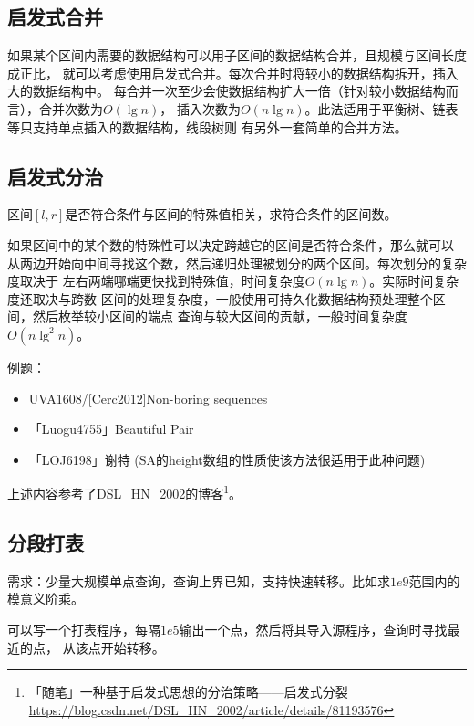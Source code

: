 \subsection{启发式合并}
如果某个区间内需要的数据结构可以用子区间的数据结构合并，且规模与区间长度成正比，
就可以考虑使用启发式合并。每次合并时将较小的数据结构拆开，插入大的数据结构中。
每合并一次至少会使数据结构扩大一倍（针对较小数据结构而言），合并次数为$O(\lg n)$，
插入次数为$O(n\lg n)$。此法适用于平衡树、链表等只支持单点插入的数据结构，线段树则
有另外一套简单的合并方法。
\subsection{启发式分治}
区间$[l,r]$是否符合条件与区间的特殊值相关，求符合条件的区间数。

如果区间中的某个数的特殊性可以决定跨越它的区间是否符合条件，那么就可以
从两边开始向中间寻找这个数，然后递归处理被划分的两个区间。每次划分的复杂度取决于
左右两端哪端更快找到特殊值，时间复杂度$O(n\lg n)$。实际时间复杂度还取决与跨数
区间的处理复杂度，一般使用可持久化数据结构预处理整个区间，然后枚举较小区间的端点
查询与较大区间的贡献，一般时间复杂度$O(n\lg^2 n)$。

例题：
\begin{itemize}
	\item UVA1608/[Cerc2012]Non-boring sequences
	\item 「Luogu4755」Beautiful Pair
	\item 「LOJ6198」谢特 (SA的height数组的性质使该方法很适用于此种问题)
\end{itemize}

上述内容参考了DSL\_HN\_2002的博客\footnote{
	「随笔」一种基于启发式思想的分治策略——启发式分裂
	\url{https://blog.csdn.net/DSL\_HN\_2002/article/details/81193576}
}。
\subsection{分段打表}
需求：少量大规模单点查询，查询上界已知，支持快速转移。比如求$1e9$范围内的模意义阶乘。

可以写一个打表程序，每隔$1e5$输出一个点，然后将其导入源程序，查询时寻找最近的点，
从该点开始转移。

